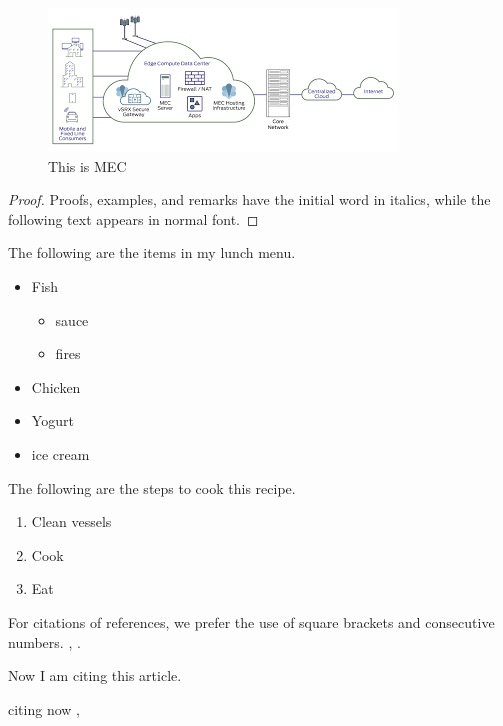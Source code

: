 \documentclass[runningheads]{llncs}
\begin{document}
\begin{figure}
\includegraphics[width=\textwidth]{mecomputing.png}
\caption{This is MEC}
\label{MecFig}
\end{figure}



%
%
\begin{proof}
Proofs, examples, and remarks have the initial word in italics,
while the following text appears in normal font.
\end{proof}


The following are the items in my lunch menu.
\begin{itemize}
    \item Fish
    \begin{itemize}
        \item sauce
        \item fires
    \end{itemize}
    \item Chicken
    \item Yogurt
    \item ice cream
\end{itemize}

The following are the steps to cook this recipe. 

\begin{enumerate}
\item Clean vessels
\item Cook
\item Eat
\end{enumerate}



For citations of references, we prefer the use of square brackets
and consecutive numbers. \cite{bariah2020prospective}, \cite{kato2020ten}.

Now I am citing this article. \cite{hoehle2015mobile}

citing now \cite{8766917}, \cite{10.5555/2667432.2667458}

%
%
%




%
\end{document}
